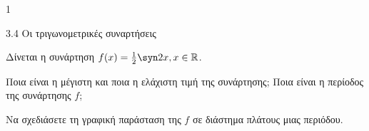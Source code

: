 \begin{ylh}{1}
\item 3.4 Οι τριγωνομετρικές συναρτήσεις
\end{ylh}
Δίνεται η συνάρτηση $f(x) = \frac{1}{2}\syn  2x, x \in \mathbb{R}$.
\begin{alist}
\item Ποια είναι η μέγιστη και ποια η ελάχιστη τιμή της συνάρτησης; Ποια είναι η περίοδος της συνάρτησης $f$;
\item Να σχεδιάσετε τη γραφική παράσταση της $f$ σε διάστημα πλάτους μιας περιόδου.
\end{alist}

